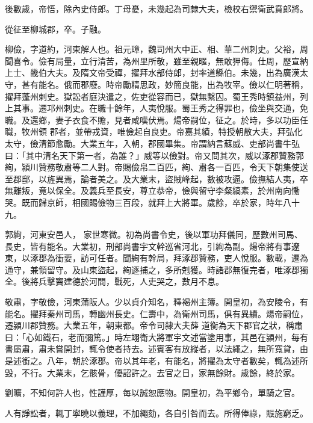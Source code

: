 \begin{pinyinscope}
 後數歲，帝悟，除內史侍郎。丁母憂，未幾起為司隸大夫，檢校右禦衛武賁郎將。



 從征至柳城郡，卒。子融。



 柳儉，字道約，河東解人也。祖元璋，魏司州大中正、相、華二州刺史。父裕，周聞喜令。儉有局量，立行清苦，為州里所敬，雖至親暱，無敢狎侮。仕周，歷宣納上士、畿伯大夫。及隋文帝受禪，擢拜水部侍郎，封率道縣伯。未幾，出為廣漢太守，甚有能名。俄而郡廢。時帝勵精思政，妙簡良能，出為牧宰。儉以仁明著稱，擢拜蓬州刺史。獄訟者庭決遣之，佐吏從容而已，獄無繫囚。蜀王秀時鎮益州，列上其事。遷邛州刺史。在職十餘年，人夷悅服。蜀王秀之得罪也，儉坐與交通，免職。及還鄉，妻子衣食不贍，見者咸嘆伏焉。煬帝嗣位，征之。於時，多以功臣任職，牧州領
 郡者，並帶戎資，唯儉起自良吏。帝嘉其績，特授朝散大夫，拜弘化太守，儉清節愈勵。大業五年，入朝，郡國畢集。帝謂納言蘇威、吏部尚書牛弘曰：「其中清名天下第一者，為誰？」威等以儉對。帝又問其次，威以涿郡贊務郭絢，潁川贊務敬肅等二人對。帝賜儉帛二百匹，絢、肅各一百匹，令天下朝集使送至郡邸，以旌異焉，論者美之。及大業末，盜賊峰起，數被攻逼。儉撫結人夷，卒無離叛，竟以保全。及義兵至長安，尊立恭帝，儉與留守李粲縞素，於州南向慟哭。既而歸京師，相國賜儉物三百段，就拜上大將軍。歲餘，卒於家，時年八十九。



 郭絢，河東安邑人，
 家世寒微。初為尚書令史，後以軍功拜儀同，歷數州司馬、長史，皆有能名。大業初，刑部尚書宇文幹巡省河北，引絢為副。煬帝將有事遼東，以涿郡為衝要，訪可任者。聞絢有幹局，拜涿郡贊務，吏人悅服。數載，遷為通守，兼領留守。及山東盜起，絢逐捕之，多所剋獲。時諸郡無復完者，唯涿郡獨全。後將兵擊竇建德於河間，戰死，人吏哭之，數月不息。



 敬肅，字敬儉，河東蒲阪人。少以貞介知名，釋褐州主簿。開皇初，為安陵令，有能名。擢拜秦州司馬，轉幽州長史。仁壽中，為衛州司馬，俱有異績。煬帝嗣位，遷潁川郡贊務。大業五年，朝東都。帝令司隸大夫薛
 道衡為天下郡官之狀，稱肅曰：「心如鐵石，老而彌篤。」時左翊衛大將軍宇文述當塗用事，其邑在潁州，每有書屬肅，肅未嘗開封，輒令使者持去。述賓客有放縱者，以法繩之，無所寬貸，由是述銜之。八年，朝於涿郡。帝以其年老，有能名，將擢為太守者數矣，輒為述所毀，不行。大業末，乞骸骨，優詔許之。去官之日，家無餘財。歲餘，終於家。



 劉曠，不知何許人也，性謹厚，每以誠恕應物。開皇初，為平鄉令，單騎之官。



 人有諍訟者，輒丁寧曉以義理，不加繩劾，各自引咎而去。所得俸祿，賑施窮乏。




\end{pinyinscope}
